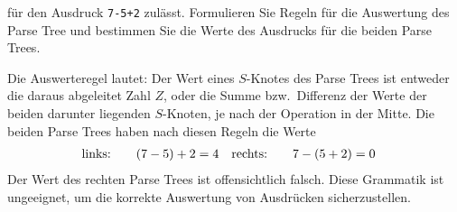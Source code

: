 für den Ausdruck \texttt{7-5+2} zulässt.
Formulieren Sie Regeln für die Auswertung des Parse Tree und bestimmen
Sie die Werte des Ausdrucks für die beiden Parse Trees.

\begin{loesung}
Die Auswerteregel lautet:
Der Wert eines $S$-Knotes des Parse Trees ist entweder die daraus
abgeleitet Zahl $Z$, oder die Summe bzw.~Differenz der Werte der beiden
darunter liegenden $S$-Knoten, je nach der Operation in der Mitte.
Die beiden Parse Trees haben nach diesen Regeln die Werte
\begin{align*}
\text{links:\qquad}&(7-5)+2=4
&
\text{rechts:\qquad}&7-(5+2)=0
\end{align*}
Der Wert des rechten Parse Trees ist offensichtlich falsch.
Diese Grammatik ist ungeeignet, um die korrekte Auswertung
von Ausdrücken sicherzustellen.
\end{loesung}


